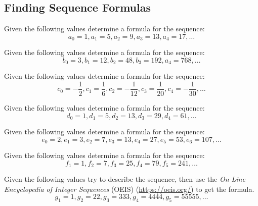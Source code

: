\clearpage

\subsection{Finding Sequence Formulas}

\begin{practiceprob}
    Given the following values determine a formula for the sequence:
    \[a_0=1, a_1=5, a_2=9, a_3=13, a_4=17, \ldots\]
    \vspace{4\baselineskip}
\end{practiceprob}

\begin{practiceprob}
    Given the following values determine a formula for the sequence:
    \[b_0=3, b_1=12, b_2=48, b_3=192, a_4=768, \ldots\]
    \vspace{4\baselineskip}
\end{practiceprob}

\begin{practiceprob}
    Given the following values determine a formula for the sequence:
    \[c_0=-\frac{1}{2}, c_1=\frac{1}{6}, c_2=-\frac{1}{12}, c_3=\frac{1}{20}, c_4=-\frac{1}{30}, \ldots\]
    \vspace{4\baselineskip}
\end{practiceprob}

\begin{practiceprob}
    Given the following values determine a formula for the sequence:
    \[d_0=1, d_1=5, d_2=13, d_3=29, d_4=61, \ldots\]
    \vspace{4\baselineskip}
\end{practiceprob}

\clearpage

\begin{practiceprob}
    Given the following values determine a formula for the sequence:
    \[e_0=2, e_1=3, e_2=7, e_3=13, e_4=27, e_5=53, e_6=107, \ldots\]
    \vspace{4\baselineskip}
\end{practiceprob}

\begin{practiceprob}
    Given the following values determine a formula for the sequence:
    \[f_1=1, f_2=7, f_3=25, f_4=79, f_5=241, \ldots\]
    \vspace{4\baselineskip}
\end{practiceprob}

\begin{practiceprob}
    Given the following values try to describe the sequence, then use the \emph{On-Line Encyclopedia of Integer Sequences} (OEIS) (\url{https://oeis.org/}) to get the formula.
    \[g_1=1, g_2=22, g_3=333, g_4=4444, g_5=55555, \ldots\]
    \vspace{4\baselineskip}
\end{practiceprob}



